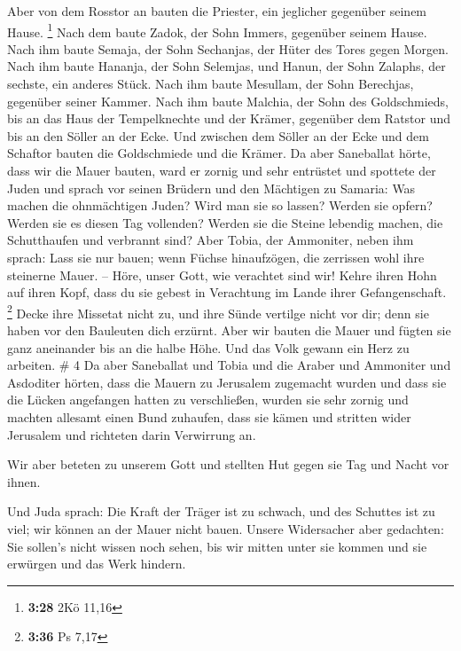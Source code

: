  Aber von dem Rosstor an bauten die Priester, ein
jeglicher gegenüber seinem Hause. \footnote{\textbf{3:28} 2Kö 11,16}
 Nach dem baute Zadok, der Sohn Immers, gegenüber seinem
Hause. Nach ihm baute Semaja, der Sohn Sechanjas, der Hüter des Tores
gegen Morgen.  Nach ihm baute Hananja, der Sohn Selemjas,
und Hanun, der Sohn Zalaphs, der sechste, ein anderes Stück. Nach ihm
baute Mesullam, der Sohn Berechjas, gegenüber seiner Kammer.
 Nach ihm baute Malchia, der Sohn des Goldschmieds, bis
an das Haus der Tempelknechte und der Krämer, gegenüber dem Ratstor und
bis an den Söller an der Ecke.  Und zwischen dem Söller
an der Ecke und dem Schaftor bauten die Goldschmiede und die Krämer.
 Da aber Saneballat hörte, dass wir die Mauer bauten,
ward er zornig und sehr entrüstet und spottete der Juden 
und sprach vor seinen Brüdern und den Mächtigen zu Samaria: Was machen
die ohnmächtigen Juden? Wird man sie so lassen? Werden sie opfern?
Werden sie es diesen Tag vollenden? Werden sie die Steine lebendig
machen, die Schutthaufen und verbrannt sind?  Aber Tobia,
der Ammoniter, neben ihm sprach: Lass sie nur bauen; wenn Füchse
hinaufzögen, die zerrissen wohl ihre steinerne Mauer. -- 
Höre, unser Gott, wie verachtet sind wir! Kehre ihren Hohn auf ihren
Kopf, dass du sie gebest in Verachtung im Lande ihrer Gefangenschaft.
\footnote{\textbf{3:36} Ps 7,17}  Decke ihre Missetat
nicht zu, und ihre Sünde vertilge nicht vor dir; denn sie haben vor den
Bauleuten dich erzürnt.  Aber wir bauten die Mauer und
fügten sie ganz aneinander bis an die halbe Höhe. Und das Volk gewann
ein Herz zu arbeiten. \# 4  Da aber Saneballat und Tobia
und die Araber und Ammoniter und Asdoditer hörten, dass die Mauern zu
Jerusalem zugemacht wurden und dass sie die Lücken angefangen hatten zu
verschließen, wurden sie sehr zornig  und machten allesamt
einen Bund zuhaufen, dass sie kämen und stritten wider Jerusalem und
richteten darin Verwirrung an.

 Wir aber beteten zu unserem Gott und stellten Hut gegen
sie Tag und Nacht vor ihnen.

 Und Juda sprach: Die Kraft der Träger ist zu schwach, und
des Schuttes ist zu viel; wir können an der Mauer nicht bauen.
 Unsere Widersacher aber gedachten: Sie sollen's nicht
wissen noch sehen, bis wir mitten unter sie kommen und sie erwürgen und
das Werk hindern.


